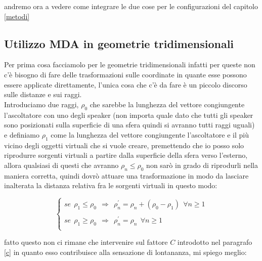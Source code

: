 \documentclass[12pt,a4paper]{report}
\begin{document}
andremo ora a vedere come integrare le due cose per le configurazioni del capitolo \ref{metodi}

\subsection{Utilizzo MDA in geometrie tridimensionali}

Per prima cosa facciamolo per le geometrie tridimensionali infatti per queste non c'è bisogno di fare delle trasformazioni sulle coordinate in quante esse possono essere applicate direttamente, l'unica cosa che c'è da fare è un piccolo discorso sulle distanze e sui raggi.\\

Introduciamo due raggi, $\rho_0$ che sarebbe la lunghezza del vettore congiungente l'ascoltatore con uno degli speaker (non importa quale dato che tutti gli speaker sono posizionati sulla superficie di una sfera quindi si avranno tutti raggi uguali) e definiamo $\rho_1$ come la lunghezza del vettore congiungente l'ascoltatore e il più vicino degli oggetti virtuali che si vuole creare, premettendo che io posso solo riprodurre sorgenti virtuali a partire dalla superficie della sfera verso l'esterno, allora qualsiasi di questi che avranno $\rho_n \leq \rho_0$ non sarò in grado di riprodurli nella maniera corretta, quindi dovrò attuare una trasformazione in modo da lasciare inalterata la distanza relativa fra le sorgenti virtuali in questo modo:

\begin{equation}
\left\{\begin{matrix}
se\ \  \rho_1 \leq \rho_0\ \ \Rightarrow \ \ \rho_n^{\prime} = \rho_n+(\rho_0 - \rho_1) \ \ \forall n \geq 1\\
\\
se\ \  \rho_1 \geq \rho_0\ \ \Rightarrow \ \ \rho_n^{\prime} = \rho_n\ \ \forall n \geq 1\\
\end{matrix}\right.
\label{jjjj}
\end{equation}

fatto questo non ci rimane che intervenire sul fattore $C$ introdotto nel paragrafo \ref{c} in quanto esso contribuisce alla sensazione di lontananza, mi spiego meglio:
\end{document}
